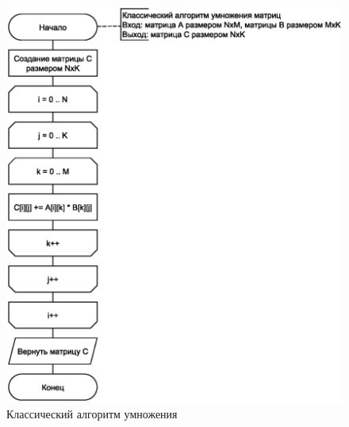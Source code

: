 \begin{figure}[h]
	\centering
	\includegraphics[]{img/default_mult.eps}
	\caption{Классический алгоритм умножения}
	\label{fig:def}
\end{figure}

\clearpage

